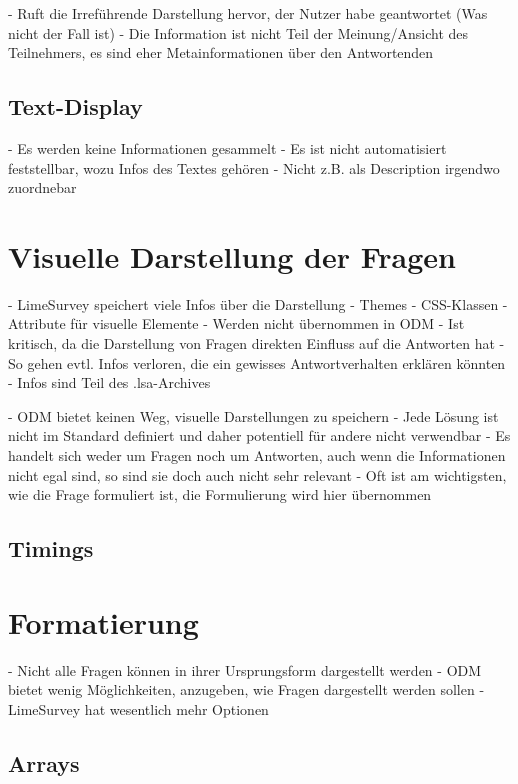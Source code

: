 - Ruft die Irreführende Darstellung hervor, der Nutzer habe geantwortet (Was nicht der Fall ist)
- Die Information ist nicht Teil der Meinung/Ansicht des Teilnehmers, es sind eher Metainformationen über den Antwortenden

\subsection{Text-Display}

- Es werden keine Informationen gesammelt
- Es ist nicht automatisiert feststellbar, wozu Infos des Textes gehören
	- Nicht z.B. als Description irgendwo zuordnebar

\section{Visuelle Darstellung der Fragen}

- LimeSurvey speichert viele Infos über die Darstellung
	- Themes
	- CSS-Klassen
	- Attribute für visuelle Elemente
- Werden nicht übernommen in ODM
- Ist kritisch, da die Darstellung von Fragen direkten Einfluss auf die Antworten hat
	- So gehen evtl. Infos verloren, die ein gewisses Antwortverhalten erklären könnten
- Infos sind Teil des .lsa-Archives

- ODM bietet keinen Weg, visuelle Darstellungen zu speichern
	- Jede Lösung ist nicht im Standard definiert und daher potentiell für andere nicht verwendbar
	- Es handelt sich weder um Fragen noch um Antworten, auch wenn die Informationen nicht egal sind, so sind sie doch auch nicht sehr relevant
- Oft ist am wichtigsten, wie die Frage formuliert ist, die Formulierung wird hier übernommen

\subsection{Timings}

\section{Formatierung}

- Nicht alle Fragen können in ihrer Ursprungsform dargestellt werden
	- ODM bietet wenig Möglichkeiten, anzugeben, wie Fragen dargestellt werden sollen
	- LimeSurvey hat wesentlich mehr Optionen

\subsection{Arrays}

